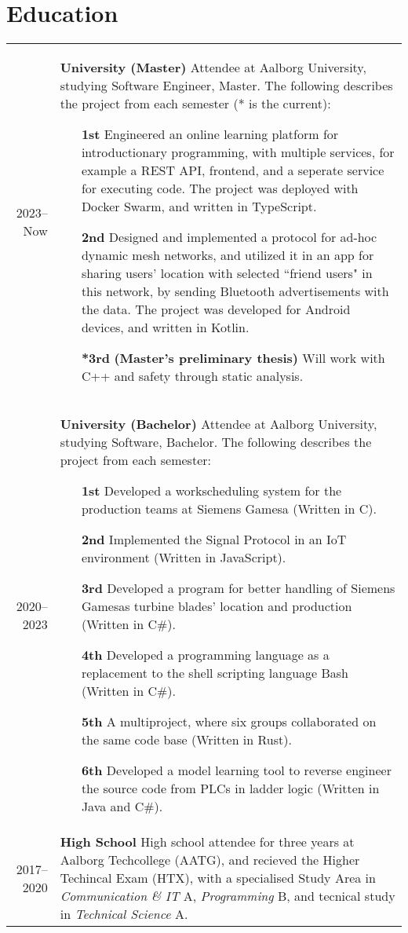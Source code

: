\newcommand{\p}[1]{\textbf{#1}\mbox{}\newline}
\def\n{\\\\}
\section*{Education}
\secsep
\begin{longtabu} to \textwidth {r|X}
    2023--Now & \p{University (Master)}
    Attendee at Aalborg University, studying Software Engineer, Master. The following describes the project from each semester (* is the current):
    \begin{itemize}[leftmargin=4em]
        \item[\textbf{1st}] Engineered an online learning platform for introductionary programming, with multiple services, for example a REST API, frontend, and a seperate service for executing code. The project was deployed with Docker Swarm, and written in TypeScript.
        \item[\textbf{2nd}] Designed and implemented a protocol for ad-hoc dynamic mesh networks, and utilized it in an app for sharing users' location with selected ``friend users" in this network, by sending Bluetooth advertisements with the data. The project was developed for Android devices, and written in Kotlin.
        \item[\textbf{*3rd}] \textbf{(Master's preliminary thesis)} Will work with C++ and safety through static analysis.
    \end{itemize}
    \\
    2020--2023 & \p{University (Bachelor)}
    Attendee at Aalborg University, studying Software, Bachelor. The following describes the project from each semester:
    \begin{itemize}[leftmargin=4em]
        \item[\textbf{1st}] Developed a workscheduling system for the production teams at Siemens Gamesa (Written in C).
        \item[\textbf{2nd}] Implemented the Signal Protocol in an IoT environment (Written in JavaScript).
        \item[\textbf{3rd}] Developed a program for better handling of Siemens Gamesas turbine blades' location and production (Written in C\#).
        \item[\textbf{4th}] Developed a programming language as a replacement to the shell scripting language Bash (Written in C\#).
        \item[\textbf{5th}] A multiproject, where six groups collaborated on the same code base (Written in Rust).
        \item[\textbf{6th}] Developed a model learning tool to reverse engineer the source code from PLCs in ladder logic (Written in Java and C\#).
    \end{itemize}
    \\
    2017--2020 & \p{High School} 
    High school attendee for three years at Aalborg Techcollege (AATG), and recieved the Higher
    Techincal Exam (HTX), with a specialised Study Area in \textit{Communication \& IT} A,
    \textit{Programming} B, and tecnical study in \textit{Technical Science} A.
\end{longtabu}

